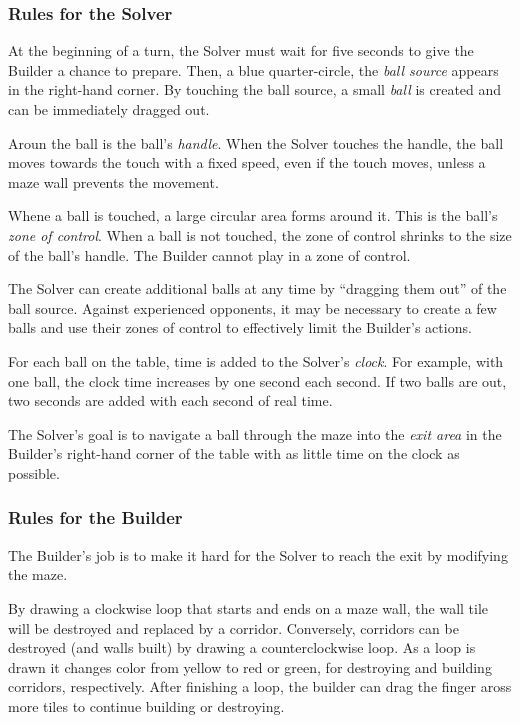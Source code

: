 \documentclass[a4paper,12pt]{article}
\begin{document}
\subsubsection{Rules for the Solver}

At the beginning of a turn, the Solver must wait for five seconds to give the
Builder a chance to prepare.
Then, a blue quarter-circle, the \emph{ball source} appears in the right-hand
corner.
By touching the ball source, a small \emph{ball} is created and can be
immediately dragged out.

Aroun the ball is the ball's \emph{handle}.
When the Solver touches the handle, the ball moves towards the touch with a
fixed speed, even if the touch moves, unless a maze wall prevents the movement.

Whene a ball is touched, a large circular area forms around it.
This is the ball's \emph{zone of control}.
When a ball is not touched, the zone of control shrinks to the size of the
ball's handle.
The Builder cannot play in a zone of control.

The Solver can create additional balls at any time by “dragging them out”
of the ball source.
Against experienced opponents, it may be necessary to create a few balls and
use their zones of control to effectively limit the Builder's actions.

For each ball on the table, time is added to the Solver's \emph{clock}.
For example, with one ball, the clock time increases by one second each second.
If two balls are out, two seconds are added with each second of real time.

The Solver's goal is to navigate a ball through the maze into the \emph{exit
area} in the Builder's right-hand corner of the table with as little time
on the clock as possible.

\subsubsection{Rules for the Builder}

The Builder's job is to make it hard for the Solver to reach the exit by
modifying the maze.

By drawing a clockwise loop that starts and ends on a maze wall, the wall
tile will be destroyed and replaced by a corridor.
Conversely, corridors can be destroyed (and walls built) by drawing a
counterclockwise loop.
As a loop is drawn it changes color from yellow to red or green, for destroying
and building corridors, respectively.
After finishing a loop, the builder can drag the finger aross more tiles
to continue building or destroying.
\end{document}
